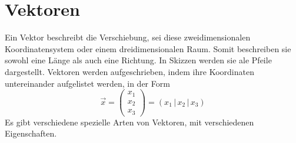 \documentclass{article}
\begin{document}
 
\newcommand{\norm}[1]{\left| {#1} \right|}  
\newcommand{\vect}[1]{\overrightarrow{#1}} 
 
\section{Vektoren}
Ein Vektor beschreibt die Verschiebung, sei diese zweidimensionalen Koordinatensystem oder einem dreidimensionalen Raum. Somit beschreiben sie sowohl eine Länge als auch eine Richtung. In Skizzen werden sie ale Pfeile dargestellt. Vektoren werden aufgeschrieben, indem ihre Koordinaten untereinander aufgelistet werden, in der Form 
\[
 \vect{x} = \begin{pmatrix} x_1 \\ x_2 \\ x_3 \end{pmatrix} = (x_1 \,\vert\, x_2 \,\vert\, x_3)
\] 
Es gibt verschiedene spezielle Arten von Vektoren, mit verschiedenen Eigenschaften. 
 
\end{document}
